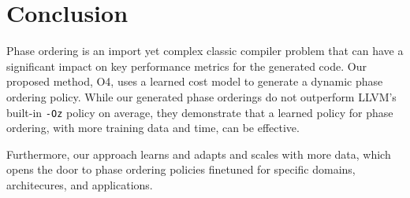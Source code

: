 \documentclass[conference]{IEEEtran}
\begin{document}
\section{Conclusion}

Phase ordering is an import yet complex classic compiler problem that can have a
significant impact on key performance metrics for the generated code. Our
proposed method, O4, uses a learned cost model to generate a dynamic phase
ordering policy. While our generated phase orderings do not outperform LLVM's
built-in \texttt{-Oz} policy on average, they demonstrate that a learned policy
for phase ordering, with more training data and time, can be effective.

Furthermore, our approach learns and adapts and scales with more data, which
opens the door to phase ordering policies finetuned for specific domains,
architecures, and applications.






\end{document}
